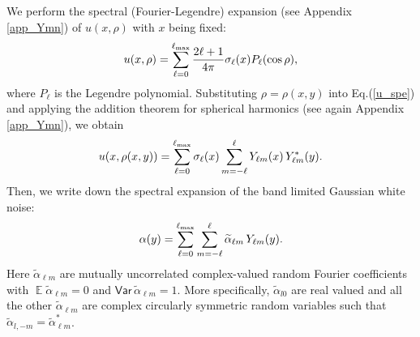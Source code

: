 \documentclass[12pt]{article}
\DeclareMathOperator{\Ex}{\mathbb{E}}
\newcommand{\Var}{{\mathsf{Var}}\,}
\begin{document}
We perform the spectral (Fourier-Legendre)
expansion (see  Appendix \ref{app_Ymn}) of $u(x, \rho)$  with $x$ being fixed:
%
\begin {equation}
\label{u_spe}
u(x, \rho) =   \sum^{\ell_{\rm max}}_{\ell=0} \frac{2\ell +1}{4\pi}  \sigma_\ell(x) P_\ell(\cos \rho),
\end {equation}
%
where $P_\ell$ is the Legendre polynomial.
Substituting $\rho=\rho(x,y)$ into Eq.(\ref{u_spe}) and applying 
the addition theorem for spherical harmonics (see again Appendix \ref{app_Ymn}), we obtain
%
\begin {equation}
\label{u_spe2}
u(x, \rho(x,y)) =  \sum^{\ell_{\rm max}}_{\ell=0} \sigma_\ell(x) \sum^\ell_{m=-\ell} 
                           Y_{\ell m} (x) \, Y_{\ell m}^* (y).
\end {equation}
%
Then, we write down the spectral expansion of the
band limited Gaussian white noise:
%
\begin {equation}
\label{alpha}
\alpha(y) = \sum^{\ell_{\rm max}}_{\ell=0} \sum^\ell_{m=-\ell}  \widetilde\alpha_{\ell m}  \, Y_{\ell m} (y). %
\end {equation}
%
Here  $\widetilde\alpha_{\ell m}$ are mutually uncorrelated
complex-valued random Fourier coefficients with 
$\Ex\widetilde\alpha_{\ell m}=0$ and $\Var\widetilde\alpha_{\ell m}=1$.
More specifically, $\widetilde\alpha_{l0}$ are real valued and all the other $\widetilde\alpha_{\ell m}$
 are complex circularly symmetric
random variables \citep[e.g.][section 9.5]{Searle2017} such that 
$\widetilde\alpha_{l,-m} = \widetilde\alpha_{\ell m}^*$.
\end{document}
